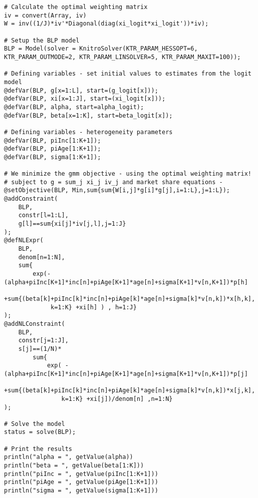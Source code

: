 \documentclass[a4paper,11pt]{article}
\begin{document}
{\begin{lstlisting}
# Calculate the optimal weighting matrix
iv = convert(Array, iv)
W = inv((1/J)*iv'*Diagonal(diag(xi_logit*xi_logit'))*iv);

# Setup the BLP model
BLP = Model(solver = KnitroSolver(KTR_PARAM_HESSOPT=6, 
KTR_PARAM_OUTMODE=2, KTR_PARAM_LINSOLVER=5, KTR_PARAM_MAXIT=100));

# Defining variables - set initial values to estimates from the logit model
@defVar(BLP, g[x=1:L], start=(g_logit[x]));
@defVar(BLP, xi[x=1:J], start=(xi_logit[x]));
@defVar(BLP, alpha, start=alpha_logit);
@defVar(BLP, beta[x=1:K], start=beta_logit[x]);

# Defining variables - heterogeneity parameters
@defVar(BLP, piInc[1:K+1]);
@defVar(BLP, piAge[1:K+1]);
@defVar(BLP, sigma[1:K+1]);

# We minimize the gmm objective - using the optimal weighting matrix! 
# subject to g = sum_j xi_j iv_j and market share equations - 
@setObjective(BLP, Min,sum{sum{W[i,j]*g[i]*g[j],i=1:L},j=1:L});
@addConstraint(
    BLP, 
    constr[l=1:L], 
    g[l]==sum{xi[j]*iv[j,l],j=1:J}
);
@defNLExpr(
    BLP,
    denom[n=1:N],
    sum{
        exp(-(alpha+piInc[K+1]*inc[n]+piAge[K+1]*age[n]+sigma[K+1]*v[n,K+1])*p[h]
            +sum{(beta[k]+piInc[k]*inc[n]+piAge[k]*age[n]+sigma[k]*v[n,k])*x[h,k],
             k=1:K} +xi[h] ) , h=1:J}
);
@addNLConstraint(
    BLP,
    constr[j=1:J], 
    s[j]==(1/N)*
        sum{
            exp( -(alpha+piInc[K+1]*inc[n]+piAge[K+1]*age[n]+sigma[K+1]*v[n,K+1])*p[j]
                 +sum{(beta[k]+piInc[k]*inc[n]+piAge[k]*age[n]+sigma[k]*v[n,k])*x[j,k],
                k=1:K} +xi[j])/denom[n] ,n=1:N}
);

# Solve the model
status = solve(BLP);

# Print the results
println("alpha = ", getValue(alpha))
println("beta = ", getValue(beta[1:K]))
println("piInc = ", getValue(piInc[1:K+1]))
println("piAge = ", getValue(piAge[1:K+1]))
println("sigma = ", getValue(sigma[1:K+1]))
\end{lstlisting}}
\end{document}
